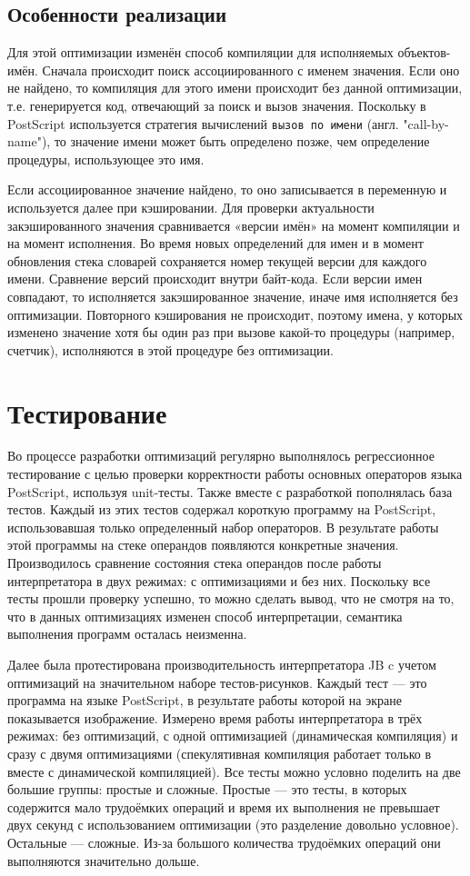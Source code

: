 \documentclass[14pt]{extarticle}
\begin{document}
	\subsection{Особенности реализации}
	Для этой оптимизации изменён способ компиляции для исполняемых объектов-имён. Сначала происходит поиск ассоциированного с именем значения. Если оно не найдено, то компиляция для этого имени происходит без данной оптимизации, т.е. генерируется код, отвечающий за поиск и вызов значения. Поскольку в PostScript используется стратегия вычислений \texttt{вызов по имени} (англ. "call-by-name"), то значение имени может быть определено позже, чем определение процедуры, использующее это имя.
	
	Если ассоциированное значение найдено, то оно записывается в переменную и используется далее при кэшировании.
	Для проверки актуальности закэшированного значения сравнивается «версии имён» на момент компиляции и на момент исполнения. Во время новых определений для имен и в момент обновления стека словарей сохраняется номер текущей версии для каждого имени. Сравнение версий происходит внутри байт-кода. Если версии имен совпадают, то исполняется закэшированное значение, иначе имя исполняется без оптимизации. Повторного кэширования не происходит, поэтому имена, у которых изменено значение хотя бы один раз при вызове какой-то процедуры (например, счетчик), исполняются в этой процедуре без оптимизации. 

	
	\pagebreak
	\section{Тестирование}
	Во процессе разработки оптимизаций регулярно выполнялось регрессионное тестирование с целью проверки корректности работы основных операторов языка PostScript, используя unit-тесты. Также вместе с разработкой пополнялась база тестов. Каждый из этих тестов содержал короткую программу на PostScript, использовавшая только определенный набор операторов. В результате работы этой программы на стеке операндов появляются конкретные значения. Производилось сравнение состояния стека операндов после работы интерпретатора в двух режимах: с оптимизациями и без них. Поскольку все тесты прошли проверку успешно, то можно сделать вывод, что не смотря на то, что в данных оптимизациях изменен способ интерпретации, семантика выполнения программ осталась неизменна.
	
	Далее была протестирована производительность интерпретатора JB c учетом оптимизаций на значительном наборе тестов-рисунков.	Каждый тест --- это программа на языке PostScript, в результате работы которой на экране показывается изображение. Измерено время работы интерпретатора в трёх режимах: без оптимизаций, с одной оптимизацией (динамическая компиляция) и сразу с двумя оптимизациями (спекулятивная компиляция работает только в вместе с динамической компиляцией). Все тесты можно условно поделить на две большие группы: простые и сложные. Простые --- это тесты, в которых содержится мало трудоёмких операций и время их выполнения не превышает двух секунд с использованием оптимизации (это разделение довольно условное). Остальные --- сложные. Из-за большого количества трудоёмких операций они выполняются значительно дольше.
	
\end{document}
